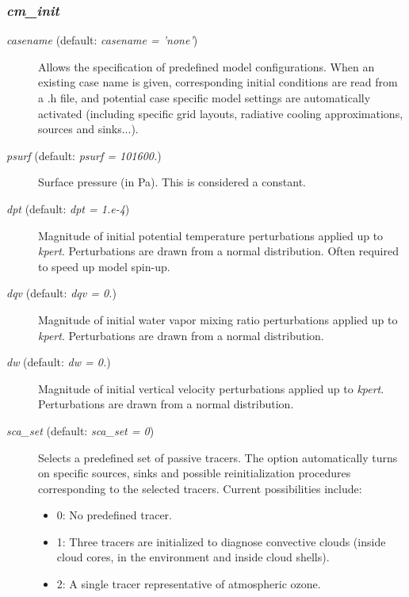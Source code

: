 \documentclass[12pt,A4,french]{article}
\begin{document}
\subsubsection{{\it cm\_init}}

\begin{description}

\item[{\it casename} (default: {\it casename = 'none'})]

Allows the specification of predefined model configurations. When an existing case name is given, corresponding initial conditions are read from a .h file, and potential case specific model settings are automatically activated (including specific grid layouts, radiative cooling approximations, sources and sinks...).

\item[{\it psurf} (default: {\it psurf = 101600.})]

Surface pressure (in Pa). This is considered a constant.

\item[{\it dpt} (default: {\it dpt = 1.e-4})]

Magnitude of initial potential temperature perturbations applied up to {\it kpert}. Perturbations are drawn from a normal distribution. Often required to speed up model spin-up.

\item[{\it dqv} (default: {\it dqv = 0.})]

Magnitude of initial water vapor mixing ratio perturbations applied up to {\it kpert}. Perturbations are drawn from a normal distribution.

\item[{\it dw} (default: {\it dw = 0.})]

Magnitude of initial vertical velocity perturbations applied up to {\it kpert}. Perturbations are drawn from a normal distribution.

\item[{\it sca\_set} (default: {\it sca\_set = 0})]

Selects a predefined set of passive tracers. The option automatically turns on specific sources, sinks and possible reinitialization procedures corresponding to the selected tracers. Current possibilities include: 
\begin{itemize}
    \item 0: No predefined tracer.\\
    \item 1: Three tracers are initialized to diagnose convective clouds (inside cloud cores, in the environment and inside cloud shells).\\
    \item 2: A single tracer representative of atmospheric ozone.\\
\end{itemize}


\end{description}
\end{document}

